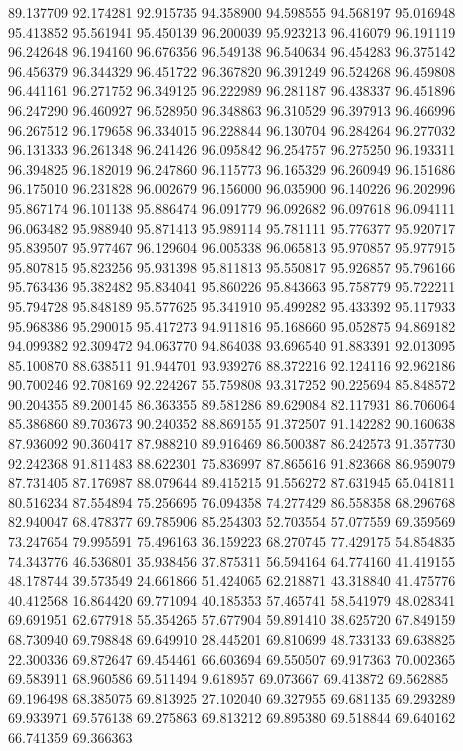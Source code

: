 89.137709
92.174281
92.915735
94.358900
94.598555
94.568197
95.016948
95.413852
95.561941
95.450139
96.200039
95.923213
96.416079
96.191119
96.242648
96.194160
96.676356
96.549138
96.540634
96.454283
96.375142
96.456379
96.344329
96.451722
96.367820
96.391249
96.524268
96.459808
96.441161
96.271752
96.349125
96.222989
96.281187
96.438337
96.451896
96.247290
96.460927
96.528950
96.348863
96.310529
96.397913
96.466996
96.267512
96.179658
96.334015
96.228844
96.130704
96.284264
96.277032
96.131333
96.261348
96.241426
96.095842
96.254757
96.275250
96.193311
96.394825
96.182019
96.247860
96.115773
96.165329
96.260949
96.151686
96.175010
96.231828
96.002679
96.156000
96.035900
96.140226
96.202996
95.867174
96.101138
95.886474
96.091779
96.092682
96.097618
96.094111
96.063482
95.988940
95.871413
95.989114
95.781111
95.776377
95.920717
95.839507
95.977467
96.129604
96.005338
96.065813
95.970857
95.977915
95.807815
95.823256
95.931398
95.811813
95.550817
95.926857
95.796166
95.763436
95.382482
95.834041
95.860226
95.843663
95.758779
95.722211
95.794728
95.848189
95.577625
95.341910
95.499282
95.433392
95.117933
95.968386
95.290015
95.417273
94.911816
95.168660
95.052875
94.869182
94.099382
92.309472
94.063770
94.864038
93.696540
91.883391
92.013095
85.100870
88.638511
91.944701
93.939276
88.372216
92.124116
92.962186
90.700246
92.708169
92.224267
55.759808
93.317252
90.225694
85.848572
90.204355
89.200145
86.363355
89.581286
89.629084
82.117931
86.706064
85.386860
89.703673
90.240352
88.869155
91.372507
91.142282
90.160638
87.936092
90.360417
87.988210
89.916469
86.500387
86.242573
91.357730
92.242368
91.811483
88.622301
75.836997
87.865616
91.823668
86.959079
87.731405
87.176987
88.079644
89.415215
91.556272
87.631945
65.041811
80.516234
87.554894
75.256695
76.094358
74.277429
86.558358
68.296768
82.940047
68.478377
69.785906
85.254303
52.703554
57.077559
69.359569
73.247654
79.995591
75.496163
36.159223
68.270745
77.429175
54.854835
74.343776
46.536801
35.938456
37.875311
56.594164
64.774160
41.419155
48.178744
39.573549
24.661866
51.424065
62.218871
43.318840
41.475776
40.412568
16.864420
69.771094
40.185353
57.465741
58.541979
48.028341
69.691951
62.677918
55.354265
57.677904
59.891410
38.625720
67.849159
68.730940
69.798848
69.649910
28.445201
69.810699
48.733133
69.638825
22.300336
69.872647
69.454461
66.603694
69.550507
69.917363
70.002365
69.583911
68.960586
69.511494
9.618957
69.073667
69.413872
69.562885
69.196498
68.385075
69.813925
27.102040
69.327955
69.681135
69.293289
69.933971
69.576138
69.275863
69.813212
69.895380
69.518844
69.640162
66.741359
69.366363
